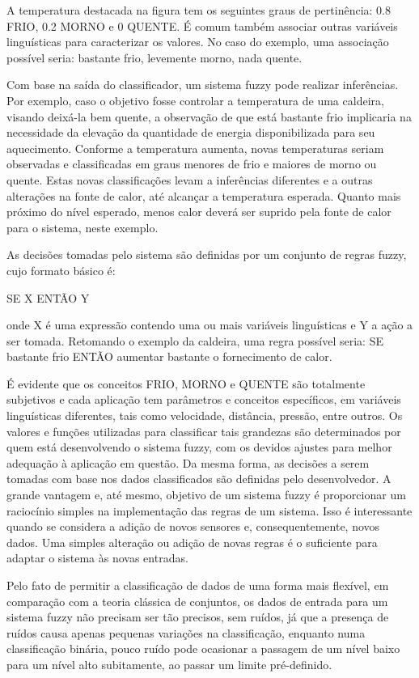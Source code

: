 A temperatura destacada na figura tem os seguintes graus de pertinência: 0.8 FRIO, 0.2 MORNO e 0 QUENTE.
É comum também associar outras variáveis linguísticas para caracterizar os valores. No caso do exemplo, uma associação
possível seria: bastante frio, levemente morno, nada quente.

Com base na saída do classificador, um sistema fuzzy pode realizar inferências. Por exemplo, caso o objetivo fosse controlar
a temperatura de uma caldeira, visando deixá-la bem quente, a observação de que está bastante frio implicaria
na necessidade da elevação da quantidade de energia disponibilizada para seu aquecimento. Conforme a temperatura aumenta, novas temperaturas seriam observadas e classificadas em graus menores de frio e maiores de morno ou quente. Estas novas classificações levam a inferências diferentes e a outras alterações na fonte de calor, até alcançar a temperatura esperada. Quanto mais próximo do nível esperado, menos calor deverá ser suprido pela fonte de calor para o sistema, neste exemplo.

As decisões tomadas pelo sistema são definidas por um conjunto de regras fuzzy, cujo formato básico é:

SE X ENTÃO Y

onde X é uma expressão contendo uma ou mais variáveis linguísticas e Y a ação a ser tomada. Retomando o exemplo da caldeira,
uma regra possível seria: SE bastante frio ENTÃO aumentar bastante o fornecimento de calor.

É evidente que os conceitos FRIO, MORNO e QUENTE são totalmente subjetivos e cada aplicação tem parâmetros e conceitos específicos, em variáveis linguísticas diferentes, tais como velocidade, distância, pressão, entre outros.
Os valores e funções utilizadas para classificar tais grandezas são determinados por quem está desenvolvendo o sistema fuzzy, com os devidos ajustes para melhor adequação à aplicação em questão. 
Da mesma forma, as decisões a serem tomadas com base nos dados classificados são definidas pelo desenvolvedor. A grande vantagem e, até mesmo, objetivo de um sistema fuzzy é proporcionar um raciocínio simples na implementação das regras de um sistema. Isso é
interessante quando se considera a adição de novos sensores e, consequentemente, novos dados. Uma simples alteração ou adição
de novas regras é o suficiente para adaptar o sistema às novas entradas. %

Pelo fato de permitir a classificação de dados de uma forma mais flexível, em comparação com a teoria clássica de conjuntos,
os dados de entrada para um sistema fuzzy não precisam ser tão precisos, sem ruídos, já que a presença de ruídos
causa apenas pequenas variações na classificação, enquanto numa classificação binária, pouco ruído pode
ocasionar a passagem de um nível baixo para um nível alto subitamente, ao passar um limite pré-definido.

